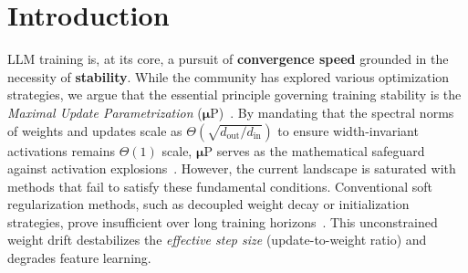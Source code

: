 \section{Introduction}

LLM training is, at its core, a pursuit of \textbf{convergence speed} grounded in the necessity of \textbf{stability}. While the community has explored various optimization strategies, we argue that the essential principle governing training stability is the \emph{Maximal Update Parametrization} ($\boldsymbol{\mu}$P)~\citep{yang2023spectral}. By mandating that the spectral norms of weights and updates scale as $\Theta(\sqrt{d_{\text{out}}/d_{\text{in}}})$ to ensure width-invariant activations remains $\Theta(1)$ scale, $\boldsymbol{\mu}$P serves as the mathematical safeguard against activation explosions~\citep{takase2025spikemorestabilizingpretraining}.  However, the current landscape is saturated with methods that fail to satisfy these fundamental conditions. Conventional soft regularization methods, such as decoupled weight decay or initialization strategies, prove insufficient over long training horizons~\citep{kosson2025weightdecaymattermup}. This unconstrained weight drift destabilizes the \emph{effective step size} (update-to-weight ratio) and degrades feature learning.

